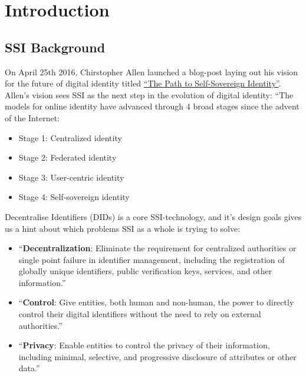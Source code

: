 \hypertarget{introduction}{%
\chapter{Introduction}\label{introduction}}

\hypertarget{ssi-background}{%
\section{SSI Background}\label{ssi-background}}

On April 25th 2016, Chirstopher Allen launched a blog-post laying out
his vision for the future of digital identity titled
\href{http://www.lifewithalacrity.com/2016/04/the-path-to-self-soverereign-identity.html}{``The
Path to Self-Sovereign Identity''}. Allen's vision sees SSI as the next
step in the evolution of digital identity: ``The models for online
identity have advanced through 4 broad stages since the advent of the
Internet:

\begin{itemize}
\tightlist
\item
  Stage 1: Centralized identity
\item
  Stage 2: Federated identity
\item
  Stage 3: User-centric identity
\item
  Stage 4: Self-sovereign identity
\end{itemize}

Decentralise Identifiers (DIDs) is a core SSI-technology, and it's
design goals gives us a hint about which problems SSI as a whole is
trying to solve:

\begin{itemize}
\tightlist
\item
  ``\textbf{Decentralization}: Eliminate the requirement for centralized
  authorities or single point failure in identifier management,
  including the registration of globally unique identifiers, public
  verification keys, services, and other information.''
\item
  ``\textbf{Control}: Give entities, both human and non-human, the power
  to directly control their digital identifiers without the need to rely
  on external authorities.''
\item
  ``\textbf{Privacy}: Enable entities to control the privacy of their
  information, including minimal, selective, and progressive disclosure
  of attributes or other data.''
\end{itemize}

